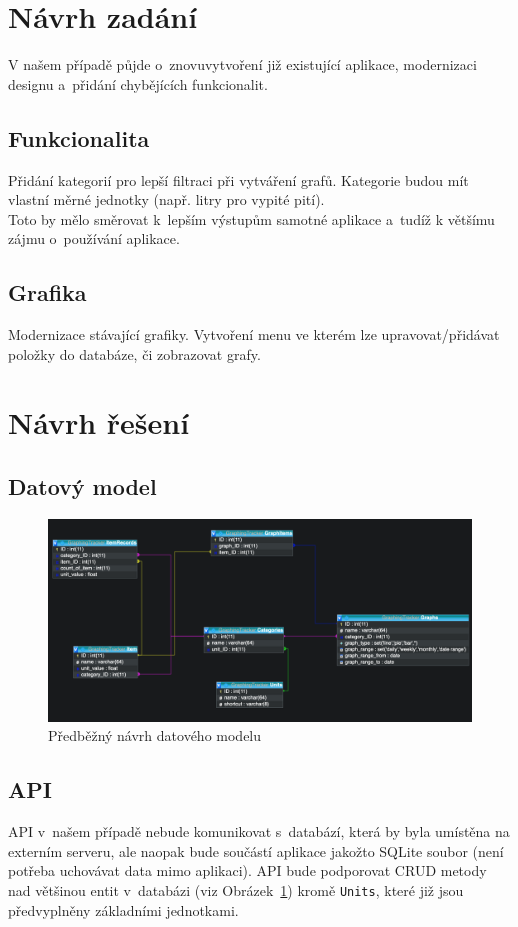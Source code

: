 \documentclass[12pt, titlepage]{article}
\begin{document}
\section{Návrh zadání}
V našem případě půjde o~znovuvytvoření již existující aplikace, modernizaci designu a~přidání chybějících funkcionalit.
	\subsection{Funkcionalita}
Přidání kategorií pro lepší filtraci při vytváření grafů. Kategorie budou mít vlastní měrné jednotky (např. litry pro vypité pití).\\
Toto by mělo směrovat k~lepším výstupům samotné aplikace a~tudíž k většímu zájmu o~používání aplikace.
	\subsection{Grafika}
Modernizace stávající grafiky. Vytvoření menu ve kterém lze upravovat/přidávat položky do databáze, či zobrazovat grafy.




\section{Návrh řešení}
	\subsection{Datový model}
\begin{figure}[h]
	\centering
	\includegraphics[scale=0.43]{database}
	\caption{Předběžný návrh datového modelu}
	\label{fig:database}
\end{figure}

	\subsection{API}
API v~našem případě nebude komunikovat s~databází, která by byla umístěna na externím serveru, ale naopak bude součástí aplikace jakožto SQLite soubor (není potřeba uchovávat data mimo aplikaci).
API bude podporovat CRUD metody nad většinou entit v~databázi (viz Obrázek~\ref{fig:database}) kromě \texttt{Units}, které již jsou předvyplněny základními jednotkami.
\end{document}
